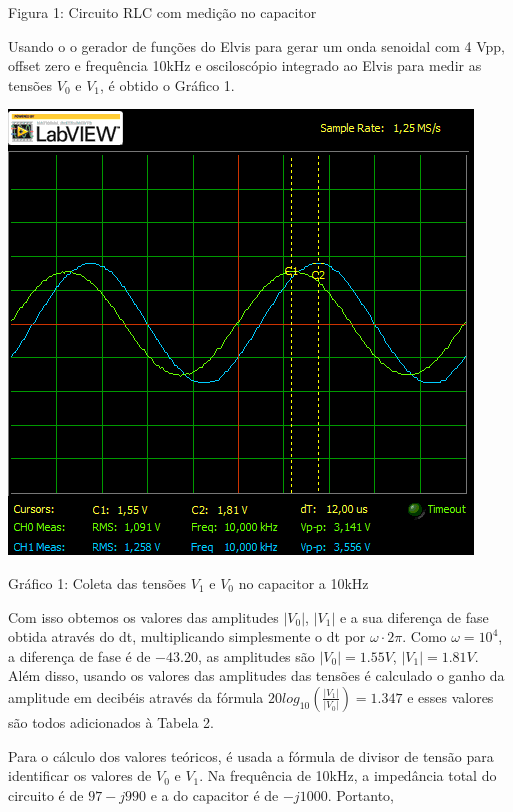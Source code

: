 \documentclass[a4 paper]{article}
\begin{document}
\begin{center}
Figura 1: Circuito RLC com medição no capacitor
\end{center}

Usando o o gerador de funções do Elvis para gerar um onda senoidal com 4 Vpp, offset zero e frequência 10kHz e osciloscópio integrado ao Elvis para medir as tensões $V_0$ e $V_1$, é obtido o Gráfico 1.


\begin{table}[h]
\centering
\includegraphics[scale=0.7]{graficos/circ1/rgadicoa1-2-10}
\end{table}

\begin{center}
Gráfico 1: Coleta das tensões $V_1$ e $V_0$ no capacitor a 10kHz
\end{center}

Com isso obtemos os valores das amplitudes $|V_0|$, $|V_1|$ e a sua diferença de fase obtida através do dt, multiplicando simplesmente o dt por $\omega\cdot2\pi$. Como $\omega = 10^4$, a diferença de fase é de $-43.20$\textdegree, as amplitudes são $|V_0|=1.55V$, $|V_1|=1.81V$. Além disso, usando os valores das amplitudes das tensões é calculado o ganho da amplitude em decibéis através da fórmula $20log_{10}\left(\frac{|V_1|}{|V_0|}\right) = 1.347$ e esses valores são todos adicionados à Tabela 2.

Para o cálculo dos valores teóricos, é usada a fórmula de divisor de tensão para identificar os valores de $V_0$ e $V_1$. Na frequência de 10kHz, a impedância total do circuito é de $97-j990$ e a do capacitor é de $-j1000$. Portanto,
\end{document}
